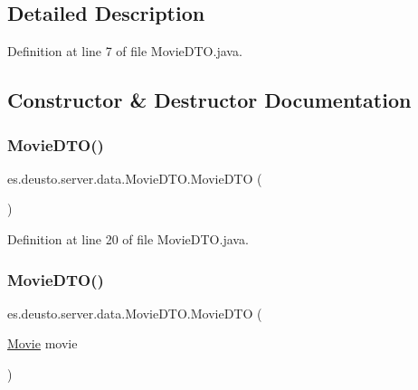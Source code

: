 \subsection{Detailed Description}


Definition at line 7 of file Movie\+D\+T\+O.\+java.



\subsection{Constructor \& Destructor Documentation}
\mbox{\label{classes_1_1deusto_1_1server_1_1data_1_1_movie_d_t_o_a8dab5027de00475ceb896ad89af993b7}} 
\subsubsection{\texorpdfstring{MovieDTO()}{MovieDTO()}\hspace{0.1cm}{\footnotesize\ttfamily [1/2]}}
{\footnotesize\ttfamily es.\+deusto.\+server.\+data.\+Movie\+D\+T\+O.\+Movie\+D\+TO (\begin{DoxyParamCaption}{ }\end{DoxyParamCaption})}



Definition at line 20 of file Movie\+D\+T\+O.\+java.

\mbox{\label{classes_1_1deusto_1_1server_1_1data_1_1_movie_d_t_o_ad09b9cd627c8906f7ab7fe86d09b9e75}} 
\subsubsection{\texorpdfstring{MovieDTO()}{MovieDTO()}\hspace{0.1cm}{\footnotesize\ttfamily [2/2]}}
{\footnotesize\ttfamily es.\+deusto.\+server.\+data.\+Movie\+D\+T\+O.\+Movie\+D\+TO (\begin{DoxyParamCaption}\item[{\mbox{\hyperlink{classes_1_1deusto_1_1server_1_1jdo_1_1_movie}{Movie}}}]{movie }\end{DoxyParamCaption})}



